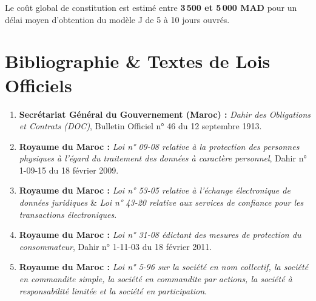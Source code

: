 \documentclass[11pt,a4paper]{report}
\begin{document}
Le coût global de constitution est estimé entre \textbf{3\,500 et 5\,000 MAD} pour un délai moyen d'obtention du modèle J de 5 à 10 jours ouvrés.

\chapter*{Bibliographie \& Textes de Lois Officiels}

\begin{enumerate}[leftmargin=*]
    \item \textbf{Secrétariat Général du Gouvernement (Maroc) :} \textit{Dahir des Obligations et Contrats (DOC)}, Bulletin Officiel n° 46 du 12 septembre 1913.
    \item \textbf{Royaume du Maroc :} \textit{Loi n° 09-08 relative à la protection des personnes physiques à l'égard du traitement des données à caractère personnel}, Dahir n° 1-09-15 du 18 février 2009.
    \item \textbf{Royaume du Maroc :} \textit{Loi n° 53-05 relative à l'échange électronique de données juridiques} \& \textit{Loi n° 43-20 relative aux services de confiance pour les transactions électroniques}.
    \item \textbf{Royaume du Maroc :} \textit{Loi n° 31-08 édictant des mesures de protection du consommateur}, Dahir n° 1-11-03 du 18 février 2011.
    \item \textbf{Royaume du Maroc :} \textit{Loi n° 5-96 sur la société en nom collectif, la société en commandite simple, la société en commandite par actions, la société à responsabilité limitée et la société en participation}.
\end{enumerate}
\end{document}
